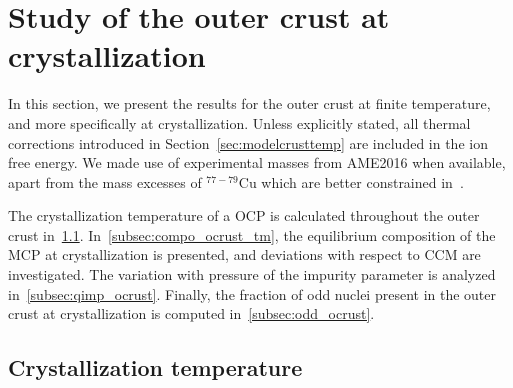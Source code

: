 \section{Study of the outer crust at crystallization}\label{sec:ocrust_tm}

In this section, we present the results for the outer crust at finite
temperature, and more specifically at crystallization.
Unless explicitly stated, all thermal corrections introduced in
Section~\ref{sec:modelcrusttemp} are included in the ion free energy.
We made use of experimental masses from AME2016 \cite{Huang2017} when 
available, apart from the mass excesses of $^{77-79}$Cu which are better 
constrained in~\cite{Welker2017}.

The crystallization temperature of a OCP is calculated throughout the outer
crust in~\ref{subsec:tm_ocrust}. In~\ref{subsec:compo_ocrust_tm}, the
equilibrium composition of the MCP at crystallization is presented, and 
deviations with respect to CCM are investigated. The variation with pressure of 
the impurity parameter is analyzed in~\ref{subsec:qimp_ocrust}. Finally, the 
fraction of odd nuclei present in the outer crust at crystallization is 
computed in~\ref{subsec:odd_ocrust}.

\subsection{Crystallization temperature}\label{subsec:tm_ocrust}

